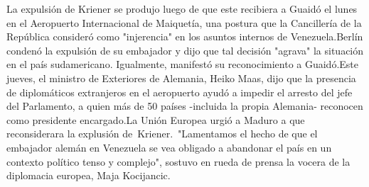 \documentclass{article}%
\begin{document}
La expulsión de Kriener se produjo luego de que este recibiera a Guaidó el lunes en el Aeropuerto Internacional de Maiquetía, una postura que la Cancillería de la República consideró como "injerencia" en los asuntos internos de Venezuela.Berlín condenó la expulsión de su embajador y dijo que tal decisión "agrava" la situación en el país sudamericano. Igualmente, manifestó su reconocimiento a Guaidó.Este jueves, el ministro de Exteriores de Alemania, Heiko Maas, dijo que la presencia de diplomáticos extranjeros en el aeropuerto ayudó a impedir el arresto del jefe del Parlamento, a quien más de 50 países {-}incluida la propia Alemania{-} reconocen como presidente encargado.La Unión Europea urgió a Maduro a que reconsiderara la explusión de~Kriener.~"Lamentamos el hecho de que el embajador alemán en Venezuela se vea obligado a abandonar el país en un contexto político tenso y complejo", sostuvo en rueda de prensa la vocera de la diplomacia europea, Maja Kocijancic.%
\newline%
%
\end{document}
